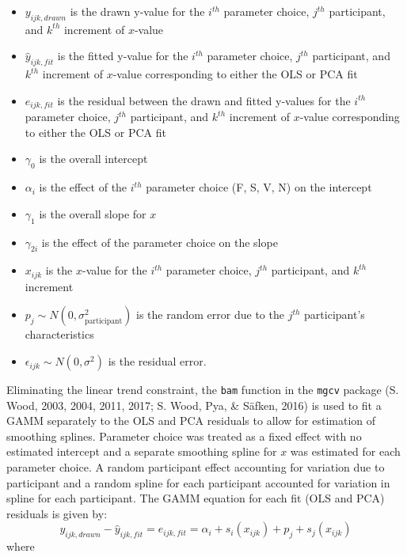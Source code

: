 \documentclass[print]{nuthesis}
\providecommand{\tightlist}{%
  \setlength{\itemsep}{0pt}\setlength{\parskip}{0pt}}
\begin{document}
\begin{itemize}
\tightlist
\item
  \(y_{ijk,drawn}\) is the drawn y-value for the \(i^{th}\) parameter choice, \(j^{th}\) participant, and \(k^{th}\) increment of \(x\)-value
\item
  \(\hat y_{ijk,fit}\) is the fitted y-value for the \(i^{th}\) parameter choice, \(j^{th}\) participant, and \(k^{th}\) increment of \(x\)-value corresponding to either the OLS or PCA fit
\item
  \(e_{ijk,fit}\) is the residual between the drawn and fitted y-values for the \(i^{th}\) parameter choice, \(j^{th}\) participant, and \(k^{th}\) increment of \(x\)-value corresponding to either the OLS or PCA fit
\item
  \(\gamma_0\) is the overall intercept
\item
  \(\alpha_i\) is the effect of the \(i^{th}\) parameter choice (F, S, V, N) on the intercept
\item
  \(\gamma_1\) is the overall slope for \(x\)
\item
  \(\gamma_{2i}\) is the effect of the parameter choice on the slope
\item
  \(x_{ijk}\) is the \(x\)-value for the \(i^{th}\) parameter choice, \(j^{th}\) participant, and \(k^{th}\) increment
\item
  \(p_{j} \sim N(0, \sigma^2_\text{participant})\) is the random error due to the \(j^{th}\) participant's characteristics
\item
  \(\epsilon_{ijk} \sim N(0, \sigma^2)\) is the residual error.
\end{itemize}

Eliminating the linear trend constraint, the \texttt{bam} function in the \texttt{mgcv} package (S. Wood, 2003, 2004, 2011, 2017; S. Wood, Pya, \& Säfken, 2016) is used to fit a GAMM separately to the OLS and PCA residuals to allow for estimation of smoothing splines.
Parameter choice was treated as a fixed effect with no estimated intercept and a separate smoothing spline for \(x\) was estimated for each parameter choice.
A random participant effect accounting for variation due to participant and a random spline for each participant accounted for variation in spline for each participant.
The GAMM equation for each fit (OLS and PCA) residuals is given by:
\begin{equation}
y_{ijk, drawn} - \hat y_{ijk, fit} = e_{ijk,fit} = \alpha_i + s_{i}(x_{ijk}) + p_{j} + s_{j}(x_{ijk})
\end{equation}
\noindent where
\end{document}
